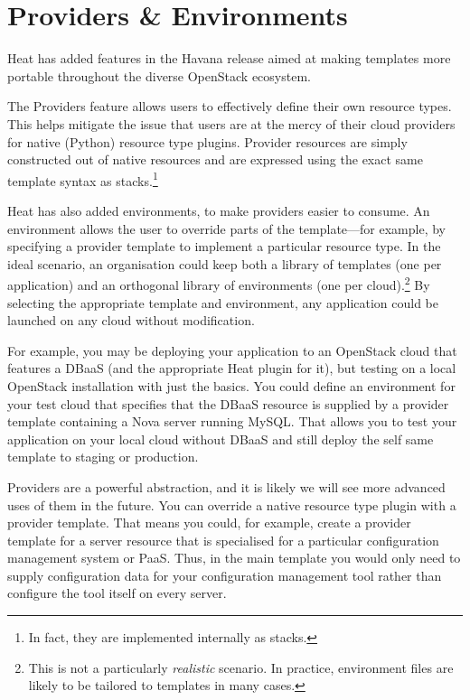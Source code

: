 \section{Providers \& Environments}

Heat has added features in the Havana release aimed at making templates more portable throughout the diverse OpenStack ecosystem.

The Providers feature allows users to effectively define their own resource types. This helps mitigate the issue that users are at the mercy of their cloud providers for native (Python) resource type plugins. Provider resources are simply constructed out of native resources and are expressed using the exact same template syntax as stacks.\footnote{In fact, they are implemented internally as stacks.}

Heat has also added environments, to make providers easier to consume. An environment allows the user to override parts of the template---for example, by specifying a provider template to implement a particular resource type. In the ideal scenario, an organisation could keep both a library of templates (one per application) and an orthogonal library of environments (one per cloud).\footnote{This is not a particularly \emph{realistic} scenario. In practice, environment files are likely to be tailored to templates in many cases.} By selecting the appropriate template and environment, any application could be launched on any cloud without modification.

For example, you may be deploying your application to an OpenStack cloud that features a DBaaS (and the appropriate Heat plugin for it), but testing on a local OpenStack installation with just the basics. You could define an environment for your test cloud that specifies that the DBaaS resource is supplied by a provider template containing a Nova server running MySQL. That allows you to test your application on your local cloud without DBaaS and still deploy the self same template to staging or production.

Providers are a powerful abstraction, and it is likely we will see more advanced uses of them in the future. You can override a native resource type plugin with a provider template. That means you could, for example, create a provider template for a server resource that is specialised for a particular configuration management system or PaaS. Thus, in the main template you would only need to supply configuration data for your configuration management tool rather than configure the tool itself on every server.
